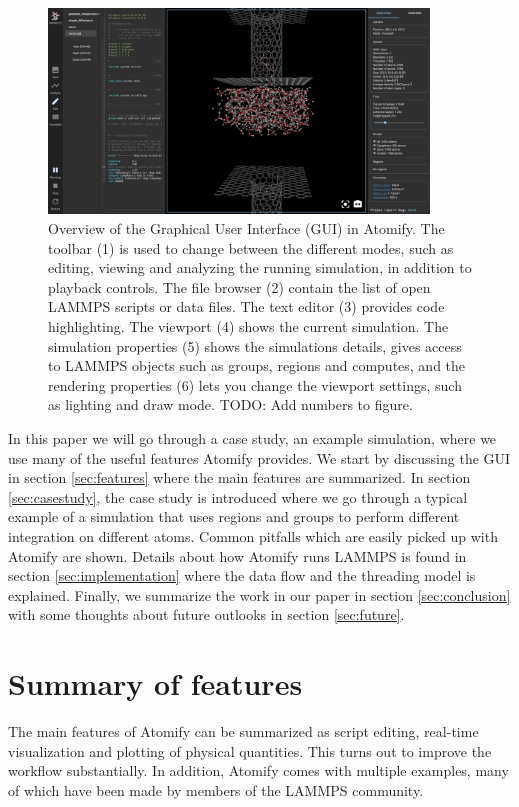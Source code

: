 \documentclass[aps,pre,twocolumn,letterpaper,floatfix,nofootinbib]{revtex4}
\begin{document}
\begin{figure}
	\centering
	\includegraphics[width=0.9\textwidth]{gui.png}
	\caption{%
    Overview of the Graphical User Interface (GUI) in Atomify.
    The toolbar (1) is used to change between the different modes, such as 
    editing, viewing and analyzing the running simulation, 
    in addition to playback controls.
    The file browser (2) contain the list of open LAMMPS scripts or data files.
    The text editor (3) provides code highlighting.
    The viewport (4) shows the current simulation.
    The simulation properties (5) shows the simulations details, gives access to 
    LAMMPS objects such as groups, regions and computes, and the rendering
    properties (6) lets you change the viewport settings, such as lighting and
    draw mode.
    TODO: Add numbers to figure.
    }
	\label{fig:gui}
\end{figure}

In this paper we will go through a case study, an example simulation, where we
use many of the useful features Atomify provides.
We start by discussing the GUI in section \ref{sec:features} where the main features are summarized.
In section \ref{sec:casestudy}, the case study is introduced where we go through a typical example
of a simulation that uses regions and groups to perform different integration on different atoms.
Common pitfalls which are easily picked up with Atomify are shown.
Details about how Atomify runs LAMMPS is found in section \ref{sec:implementation} where the data flow and the threading model is explained.
Finally, we summarize the work in our paper in section \ref{sec:conclusion} with some thoughts about future outlooks in section \ref{sec:future}.

\section{\label{sec:features}Summary of features}
The main features of Atomify can be summarized as script editing,
real-time visualization and plotting of physical quantities.
This turns out to improve the workflow substantially.
In addition, Atomify comes with multiple examples,
many of which have been made by members of the LAMMPS community.
\end{document}
